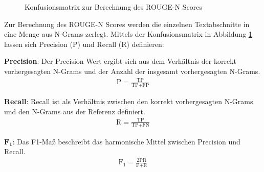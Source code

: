 \begin{figure}[h!]
    \centering
{}
\caption{Konfusionsmatrix zur Berechnung des ROUGE-N Scores}
\label{confusionmatrix}
\end{figure}

Zur Berechnung des ROUGE-N Scores werden die einzelnen Textabschnitte in eine Menge aus N-Grams zerlegt.
Mittels der Konfusionsmatrix in Abbildung \ref{confusionmatrix} lassen sich Precision (P) und Recall (R) definieren:
\begin{addmargin}[30pt]{30pt}
    \textbf{Precision}: 
    Der Precision Wert ergibt sich aus dem Verhältnis der korrekt vorhergesagten N-Grams und der Anzahl der insgesamt vorhergesagten N-Grams.
    \begin{align*}
    \text{P} = \frac{\text{TP}}{\text{TP}+\text{FP}}
    \end{align*}

    \textbf{Recall}:
    Recall ist als Verhältnis zwischen den korrekt vorhergesagten N-Grams und den N-Grams aus der Referenz definiert.
    \begin{align*}
    \text{R} = \frac{\text{TP}}{\text{TP}+\text{FN}}
    \end{align*}

    $\textbf{F}_\textbf{1}$:
    Das F1-Maß beschreibt das harmonische Mittel zwischen Precision und Recall.
    \begin{align*}
    \text{F}_\text{1} = \frac{2\text{PR}}{\text{P}+\text{R}}
    \end{align*}
\end{addmargin}

